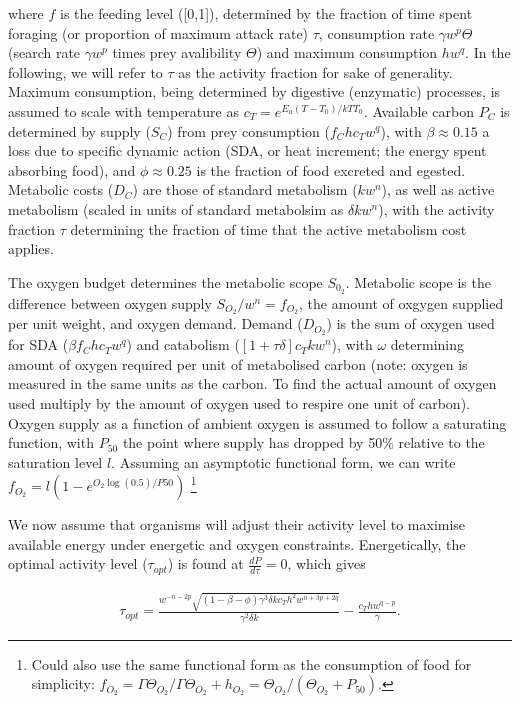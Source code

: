 \documentclass{article}
\begin{document}
where $f$ is the feeding level ([0,1]), determined by the fraction of time spent foraging (or proportion of maximum attack rate) $\tau$, consumption rate $\gamma w^p \Theta$ (search rate $\gamma w^p$ times prey avalibility $\Theta$) and maximum consumption $h w^q$. In the following, we will refer to $\tau$ as the activity fraction for sake of generality. Maximum consumption, being determined by digestive (enzymatic) processes, is assumed to scale with temperature as $c_T = e^{E_a(T-T_0)/kTT_0}$. Available carbon $P_C$ is determined by supply ($S_C$) from prey consumption ($f_C h c_T w^q$), with $\beta \approx 0.15$ a loss due to specific dynamic action (SDA, or heat increment; the energy spent absorbing food), and $\phi \approx 0.25$ is the fraction of food excreted and egested. Metabolic costs ($D_C$) are those of standard metabolism ($k w^n$), as well as active metabolism (scaled in units of standard metabolsim as $\delta k w^n$), with the activity fraction $\tau$ determining the fraction of time that the active metabolism cost applies.  



The oxygen budget determines the metabolic scope $S_{0_2}$. Metabolic scope is the difference between oxygen supply $S_{O_2}/w^n=f_{O_2}$, the amount of oxgygen supplied per unit weight, and oxygen demand. Demand ($D_{O_2}$) is the sum of oxygen used for SDA ($\beta f_C h c_T w^q$) and catabolism ($[1+\tau \delta] c_T k w^n$), with $\omega$ determining amount of oxygen required per unit of metabolised carbon (note: oxygen is measured in the same units as the carbon. To find the actual amount of oxygen used multiply by the amount of oxygen used to respire one unit of carbon). Oxygen supply as a function of ambient oxygen is assumed to follow a saturating function, with $P_{50}$ the point where supply has dropped by 50\% relative to the saturation level $l$. Assuming an asymptotic functional form, we can write $f_{O_2}=l(1-e^{O_2\log(0.5)/P50})$ \footnote{Could also use the same functional form as the consumption of food for simplicity: $f_{O_2} = \Gamma \Theta_{O_2}/\Gamma \Theta_{O_2} + h_{O_2} = \Theta_{O_2}/(\Theta_{O_2} + P_{50}).$}

We now assume that organisms will adjust their activity level to maximise available energy under energetic and oxygen constraints. Energetically, the optimal activity level ($\tau_{opt}$) is found at $\frac{dP}{d\tau}=0$, which gives

\begin{align}
\tau_{opt} = \frac{w^{-n-2 p} \sqrt{(1-\beta-\phi)\gamma^3 \delta k c_T h^2  w^{n+3 p+2 q}}}{\gamma^2 \delta k}-\frac{c_T h w^{q-p}}{\gamma}.
\end{align}
\end{document}
